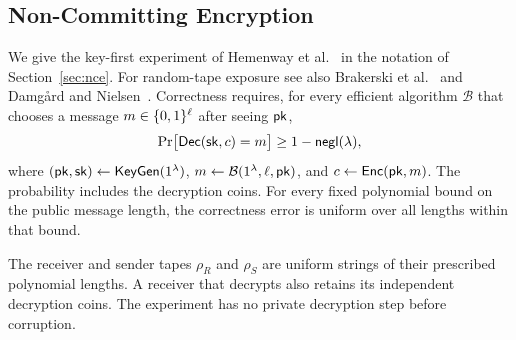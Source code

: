 \subsection{Non-Committing Encryption}
\label{app:nce}

We give the key-first experiment of Hemenway et al.\
\cite[Definition~2]{HemenwayEtAl2016QuasiOptimalNCE}
in the notation of Section~\ref{sec:nce}. For random-tape exposure see also
Brakerski et al.~\cite[full version, Definition~11]{BrakerskiEtAl2020ConstantNCE}
and Damg{\aa}rd and Nielsen~\cite[full version, Section~4]{DamgardNielsen2000NCE}.
Correctness requires, for every efficient algorithm $\mathcal B$ that
chooses a message $m\in\{0,1\}^\ell$ after seeing $\mathsf{pk}$,
\[
  \Pr\bigl[\mathsf{Dec}(\mathsf{sk},c)=m\bigr]\geq 1-\mathop{\mathsf{negl}}(\lambda),
\]
where $(\mathsf{pk},\mathsf{sk})\mathrel{\leftarrow}\mathsf{KeyGen}(1^\lambda)$,
$m\mathrel{\leftarrow}\mathcal B(1^\lambda,\ell,\mathsf{pk})$, and
$c\mathrel{\leftarrow}\mathsf{Enc}(\mathsf{pk},m)$.  The probability includes the decryption coins.  For every fixed polynomial
bound on the public message length, the correctness error is uniform
over all lengths within that bound.

The receiver and sender tapes $\rho_R$ and $\rho_S$ are uniform strings
of their prescribed polynomial lengths. A receiver that decrypts also
retains its independent decryption coins. The experiment has no private decryption step before corruption.

